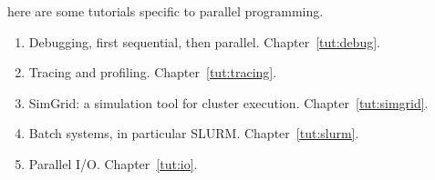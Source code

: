 
here are some tutorials specific to parallel programming.
\begin{enumerate}
\item Debugging, first sequential, then parallel. Chapter~\ref{tut:debug}.
\item Tracing and profiling. Chapter~\ref{tut:tracing}.
\item SimGrid: a simulation tool for cluster execution. Chapter~\ref{tut:simgrid}.
\item Batch systems, in particular \ac{SLURM}. Chapter~\ref{tut:slurm}.
\item Parallel I/O. Chapter~\ref{tut:io}.
\end{enumerate}
